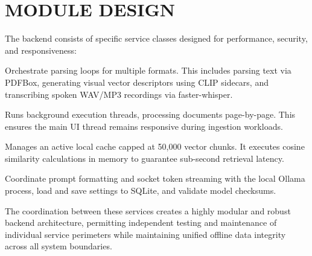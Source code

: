 \documentclass[12pt,a4paper]{report}
\begin{document}
\section{MODULE DESIGN}
The backend consists of specific service classes designed for performance, security, and responsiveness:
\begin{description}[itemsep=4pt]
    \item[\textbf{Services (Doc/Image/Audio):}] Orchestrate parsing loops for multiple formats. This includes parsing text via PDFBox, generating visual vector descriptors using CLIP sidecars, and transcribing spoken WAV/MP3 recordings via faster-whisper.
    \item[\textbf{AsyncDocumentProcessor:}] Runs background execution threads, processing documents page-by-page. This ensures the main UI thread remains responsive during ingestion workloads.
    \item[\textbf{Vector Retrieval (ChromaDBService):}] Manages an active local cache capped at 50,000 vector chunks. It executes cosine similarity calculations in memory to guarantee sub-second retrieval latency.
    \item[\textbf{Ollama/Setting/Guard Services:}] Coordinate prompt formatting and socket token streaming with the local Ollama process, load and save settings to SQLite, and validate model checksums.
\end{description}

The coordination between these services creates a highly modular and robust backend architecture, permitting independent testing and maintenance of individual service perimeters while maintaining unified offline data integrity across all system boundaries.
\end{document}
